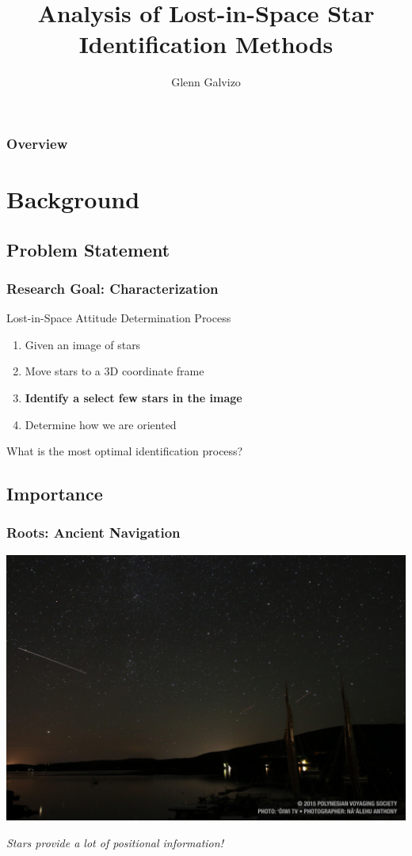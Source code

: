 \documentclass[11pt]{beamer}
\author{Glenn Galvizo}
\title{Analysis of Lost-in-Space Star Identification Methods}
\institute{University of Hawaii at Manoa - Advisor: Dr. Lipyeow Lim}
\begin{document}
    \begin{frame}
        \titlepage
    \end{frame}

    \begin{frame}
        \frametitle{Overview}
        \tableofcontents
    \end{frame}

    \section{Background}\label{sec:background}
    \subsection{Problem Statement}\label{subsec:problemStatement}
    \begin{frame}
        \frametitle{Research Goal: Characterization}
        \begin{block}{Lost-in-Space Attitude Determination Process}
            \begin{enumerate}
                \item Given an image of stars \medskip
                \item Move stars to a 3D coordinate frame \medskip
                \item \textbf{Identify a select few stars in the image} \medskip
                \item Determine how we are oriented \medskip
            \end{enumerate}
        \end{block} \bigskip
        What is the most optimal identification process?
    \end{frame}

    \subsection{Importance}\label{subsec:importance}
    \begin{frame}
        \frametitle{Roots: Ancient Navigation}
        \centerline{\includegraphics[scale=0.16]{images/hokulea}}
        \centerline{\textit{Stars provide a lot of positional information!}}
    \end{frame}
\end{document}
